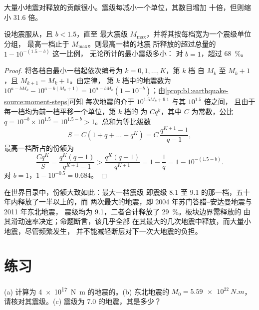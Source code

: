 大量小地震对释放的贡献很小。震级每减小一个单位，其数目增加
十倍，但则缩小 31.6 倍。

\begin{proposition}[最大地震释放了大部分地震矩]\label{prop:b1:earthquake-source:largest}
设地震服从，且 $b < 1.5$，直至
最大震级 $M_{\max}$，并将其按每档宽为一个震级单位分组，
最高一档止于 $M_{\max}$。则最高一档的地震
所释放的超过总量的 $1 - 10^{-(1.5 - b)}$ 这一比例，
无论所计的最小震级多小：
对 $b = 1$，超过 \qty{68}{\percent}。
\end{proposition}

\begin{proof}
将各档自最小一档起依次编号为 $k = 0, 1, \dots, K$，第 $k$ 档
自 $M_k$ 至 $M_k + 1$，且 $M_{k+1} = M_k + 1$。由定律，
第 $k$ 档中的地震数为 $10^{a - bM_k} - 10^{a - b(M_k+1)} =
10^{a - bM_k}(1 - 10^{-b})$；由\cref{prop:b1:earthquake-source:moment-steps}可知
每次地震的介于 $10^{1.5M_k + 9.1}$ 与其 $10^{1.5}$ 倍之间，
且由于每一档均为前一档平移一个单位，第 $k$ 档的
为 $C q^k$，其中 $C$ 为常数，公比
$q = 10^{-b}\times10^{1.5} = 10^{1.5 - b} > 1$。总和为等比级数
\[
  S = C(1 + q + \dots + q^K) = C\,\frac{q^{K+1} - 1}{q - 1} ,
\]
最高一档所占的份额为
\[
  \frac{C q^K}{S} = \frac{q^K (q - 1)}{q^{K+1} - 1}
  > \frac{q^K (q - 1)}{q^{K+1}} = 1 - \frac1q = 1 - 10^{-(1.5 - b)} .
\]
对 $b = 1$，$1 - 10^{-0.5} = 0.684$。
\end{proof}

在世界目录中，份额大致如此：最大一档震级
即震级 8.1 至 9.1 的那一档，五十年内释放了一半以上的，而
两次最大的地震，即 2004 年苏门答腊–安达曼地震与 2011 年东北地震，
震级均为 9.1，二者合计释放了 \qty{29}{\percent}。板块边界需释放的
由其滑动速率决定；命题断言，该几乎全部
在其最大的几次地震中释放，而大量小地震，尽管频繁发生，
并不能减轻断层对下一次大地震的负担。

\section{练习}

\begin{exercise}[$\star$]\label{exo:b1:earthquake-source:1}
(a) 计算为
\qty{4e17}{N.m} 的地震的。(b) 东北地震的 $M_0 = \qty{5.59e22}{N.m}$，
请核对其震级。(c) 震级为
7.0 的地震，其是多少？
\end{exercise}

